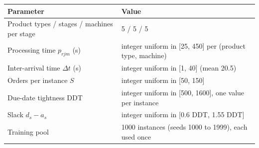 \begin{tabular}{ll}
\toprule
Parameter & Value \\
\midrule
Product types / stages / machines per stage & 5 / 5 / 5 \\
Processing time $p_{rjm}$ (s) & integer uniform in [25, 450] per (product type, machine) \\
Inter-arrival time $\Delta t$ (s) & integer uniform in [1, 40] (mean 20.5) \\
Orders per instance $S$ & integer uniform in [50, 150] \\
Due-date tightness DDT & integer uniform in [500, 1600], one value per instance \\
Slack $d_s - a_s$ & integer uniform in [0.6 DDT, 1.55 DDT] \\
Training pool & 1000 instances (seeds 1000 to 1999), each used once \\
\bottomrule
\end{tabular}
